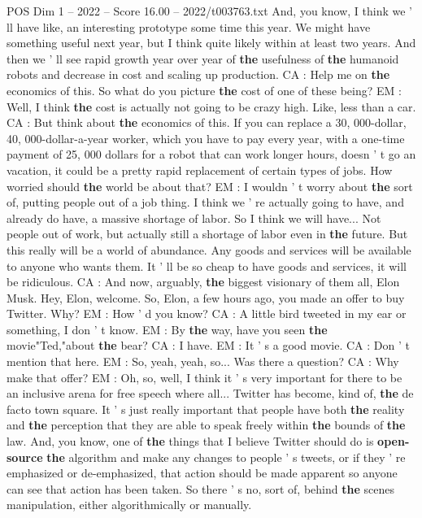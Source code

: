 \begin{textsample}{POS Dim 1 – 2022 – Score 16.00 – 2022/t003763.txt}
And, you know, I think we ' ll have like, an interesting prototype some time this year.
We might have something useful next year, but I think quite likely within at least two years.
And then we ' ll see rapid growth year over year of \textbf{the} usefulness of \textbf{the} humanoid robots and decrease in cost and scaling up production.
CA : Help me on \textbf{the} economics of this.
So what do you picture \textbf{the} cost of one of these being?
EM : Well, I think \textbf{the} cost is actually not going to be crazy high.
Like, less than a car.
CA : But think about \textbf{the} economics of this.
If you can replace a 30, 000-dollar, 40, 000-dollar-a-year worker, which you have to pay every year, with a one-time payment of 25, 000 dollars for a robot that can work longer hours, doesn ' t go an vacation, it could be a pretty rapid replacement of certain types of jobs.
How worried should \textbf{the} world be about that?
EM : I wouldn ' t worry about \textbf{the} sort of, putting people out of a job thing.
I think we ' re actually going to have, and already do have, a massive shortage of labor.
So I think we will have...
Not people out of work, but actually still a shortage of labor even in \textbf{the} future.
But this really will be a world of abundance.
Any goods and services will be available to anyone who wants them.
It ' ll be so cheap to have goods and services, it will be ridiculous.
CA : And now, arguably, \textbf{the} biggest visionary of them all, Elon Musk.
Hey, Elon, welcome.
So, Elon, a few hours ago, you made an offer to buy Twitter.
Why?
EM : How ' d you know?
CA : A little bird tweeted in my ear or something, I don ' t know.
EM : By \textbf{the} way, have you seen \textbf{the} movie"Ted,"about \textbf{the} bear?
CA : I have.
EM : It ' s a good movie.
CA : Don ' t mention that here.
EM : So, yeah, yeah, so...
Was there a question?
CA : Why make that offer?
EM : Oh, so, well, I think it ' s very important for there to be an inclusive arena for free speech where all...
Twitter has become, kind of, \textbf{the} de facto town square.
It ' s just really important that people have both \textbf{the} reality and \textbf{the} perception that they are able to speak freely within \textbf{the} bounds of \textbf{the} law.
And, you know, one of \textbf{the} things that I believe Twitter should do is \textbf{open-source} \textbf{the} algorithm and make any changes to people ' s tweets, or if they ' re emphasized or de-emphasized, that action should be made apparent so anyone can see that action has been taken.
So there ' s no, sort of, behind \textbf{the} scenes manipulation, either algorithmically or manually.

\end{textsample}
